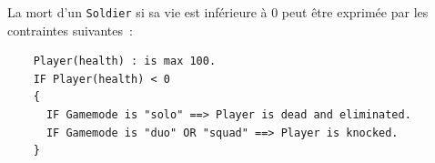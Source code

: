 \goodbreak
\begin{samepage}
La mort d'un \texttt{Soldier} si sa vie est inférieure à 0 peut être exprimée par les contraintes suivantes~:
{
\footnotesize
\begin{framed}
\begin{verbatim}
    Player(health) : is max 100.
    IF Player(health) < 0
    {
      IF Gamemode is "solo" ==> Player is dead and eliminated.
      IF Gamemode is "duo" OR "squad" ==> Player is knocked.
    }
\end{verbatim}
\end{framed}
}
\end{samepage}






